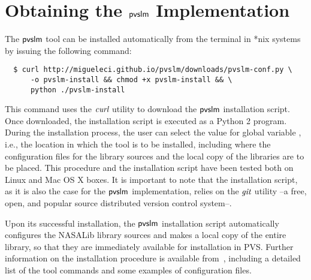 \section{Obtaining the $\textsf{pvslm}$ Implementation}
\label{sec.install}

The $\textsf{pvslm}$ tool can be installed automatically from the terminal in
*nix systems by issuing the following command:
%
{\small\begin{verbatim}
  $ curl http://migueleci.github.io/pvslm/downloads/pvslm-conf.py \
      -o pvslm-install && chmod +x pvslm-install && \
      python ./pvslm-install
\end{verbatim}}
%
This command uses the $\textit{curl}$ utility to download the $\textsf{pvslm}$
installation script. Once downloaded, the installation script is
executed as a Python 2 program.  During the installation process, the
user can select the value for global variable \cde{PVS\_PATH}, i.e.,
the location in which the tool is to be installed, including where the
configuration files for the library sources and the local copy of the
libraries are to be placed. This procedure and the installation script
have been tested both on Linux and Mac OS X boxes. It is important to
note that the installation script, as it is also the case for the
$\textsf{pvslm}$ implementation, relies on the $\textit{git}$ utility --a free, open,
and popular source distributed version control system--.

Upon its successful installation, the $\textsf{pvslm}$ installation script
automatically configures the NASALib library sources and makes a local
copy of the entire library, so that they are immediately available for
installation in PVS.  Further information on the installation
procedure is available from~\cite{pvslm}, including a detailed list of
the tool commands and some examples of configuration files.
